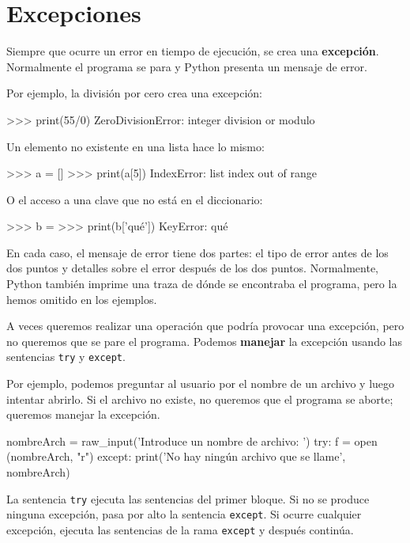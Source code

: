 \section{Excepciones}

  
  

Siempre que ocurre un error en tiempo de ejecución, se crea una \textbf{excepción}.
Normalmente el programa se para y Python presenta un mensaje de error.

Por ejemplo, la división por cero crea una excepción:
\begin{pyconcode}
>>> print(55/0)
ZeroDivisionError: integer division or modulo
\end{pyconcode}

Un elemento no existente en una lista hace lo mismo:
\begin{pyconcode}
>>> a = []
>>> print(a[5])
IndexError: list index out of range
\end{pyconcode}

O el acceso a una clave que no está en el diccionario:
\begin{pyconcode}
>>> b = {}
>>> print(b['qué'])
KeyError: qué
\end{pyconcode}

En cada caso, el mensaje de error tiene dos partes: el tipo de error
antes de los dos puntos y detalles sobre el error después de los dos
puntos. Normalmente, Python también imprime una traza de dónde se
encontraba el programa, pero la hemos omitido en los ejemplos.


A veces queremos realizar una operación que podría provocar una excepción,
pero no queremos que se pare el programa. Podemos \textbf{manejar}
la excepción usando las sentencias \texttt{try} y \texttt{except}.

Por ejemplo, podemos preguntar al usuario por el nombre de un archivo
y luego intentar abrirlo. Si el archivo no existe, no queremos que
el programa se aborte; queremos manejar la excepción.
\begin{pythoncode}
nombreArch = raw_input('Introduce un nombre de archivo: ')
try:
  f = open (nombreArch, "r")
except:
  print('No hay ningún archivo que se llame', nombreArch)
\end{pythoncode}

La sentencia \texttt{try} ejecuta las sentencias del primer bloque.
Si no se produce ninguna excepción, pasa por alto la sentencia \texttt{except}.
Si ocurre cualquier excepción, ejecuta las sentencias de la rama \texttt{except}
y después continúa.

